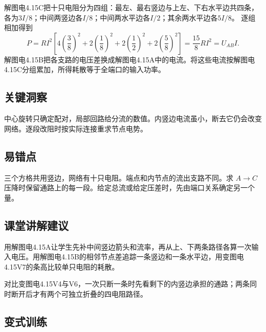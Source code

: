 \documentclass[UTF8,fontset=fandol,a4paper,11pt]{ctexart}
\begin{document}
解图电4.15C把十只电阻分为四组：最左、最右竖边与上左、下右水平边共四条，各为$3I/8$；中间两竖边各$I/8$；中间两水平边各$I/2$；其余两水平边各$5I/8$。
逐组相加得到
\[
P=RI^2\left[4\left(\frac38\right)^2+2\left(\frac18\right)^2
+2\left(\frac12\right)^2+2\left(\frac58\right)^2\right]
=\frac{15}{8}RI^2=U_{AB}I.
\]
解图电4.15B把各支路的电压差换成解图电4.15A中的电流。将这些电流按解图电4.15C分组累加，所得耗散等于全端口的输入功率。




\subsection*{关键洞察}

中心旋转只确定配对，局部回路给分流的数值。内竖边电流虽小，断去它仍会改变网络。逐段改阻时按实际连接重求节点电势。



\subsection*{易错点}

三个方格共用竖边，网络有十只电阻。端点和内节点的流出支路不同。求 $A\to C$ 压降时保留通路上的每一段。给定总流或给定压差时，先由端口关系确定另一个量。



\subsection*{课堂讲解建议}

用解图电4.15A让学生先补中间竖边箭头和流率，再从上、下两条路径各算一次输入电压。用解图电4.15B的相邻节点差追踪一条竖边和一条水平边，用变图电4.15V7的条高比较单只电阻的耗散。

对比变图电4.15V4与V6，一次只断一条时先看剩下的内竖边承担的通路；两条同时断开后才有两个可独立折叠的四电阻路径。


\subsection*{变式训练}
\end{document}
